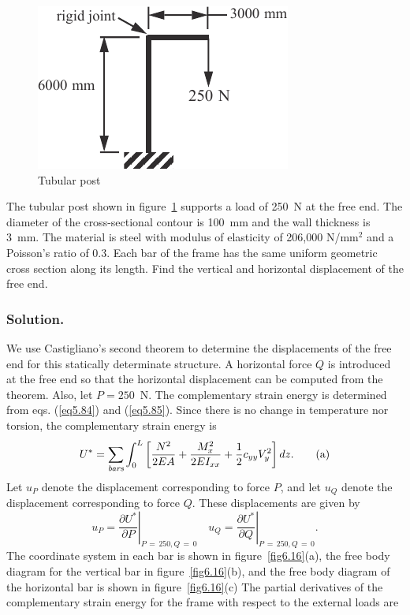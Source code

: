 \documentclass{AeroStructure-ERJohnson}
\begin{document}
\begin{figure}
\vspace{12pt}
\includegraphics{Figure_6-15.pdf}
\caption{Tubular post \label{fig6.15}}
\end{figure}

\begin{example}\label{ex6.7}The tubular post shown in figure~\ref{fig6.15} supports a load of 250~N at the free end. The diameter of the cross-sectional contour is 100~mm and the wall thickness is 3~mm. The material is steel with modulus of elasticity of 206,000 N/mm$^2$ and a Poisson's ratio of 0.3. Each bar of the frame has the same uniform geometric cross section along its length. Find the vertical and horizontal displacement of the free end.


\subsubsection{Solution.} We use Castigliano's second theorem to determine the displacements of the free end for this statically determinate structure. A horizontal force $Q$ is introduced at the free end so that the horizontal displacement can be computed from the theorem. Also, let $P = 250$~N. The complementary strain energy is determined from eqs. (\ref{eq5.84}) and (\ref{eq5.85}). Since there is no change in temperature nor torsion, the complementary strain energy is
\begin{equation*}
U^{*}=\sum_{{\it bars}}\int_{0}^{L}\left[\frac{N^{2}}{2 E A}+\frac{M_{x}^{2}}{2 E I_{x x}}+\frac{1}{2} c_{y y} V_{y}^{2}\right] d z.\tag{a}
\end{equation*}
Let $u_{P}$ denote the displacement corresponding to force $P$, and let $u_{Q}$ denote the displacement corresponding to force $Q$. These displacements are given by\pagebreak
\begin{equation*}
u_{P}=\left.\frac{\partial U^{*}}{\partial P}\right|_{P\,=\,250, Q\,=\,0} \quad u_{Q}=\left.\frac{\partial U^{*}}{\partial Q}\right|_{P\,=\,250, Q\,=\,0}.\tag{b}
\end{equation*}
The coordinate system in each bar is shown in figure~\ref{fig6.16}(a), the free body diagram for the vertical bar in figure~\ref{fig6.16}(b), and the free body diagram of the horizontal bar is shown in figure~\ref{fig6.16}(c) The partial derivatives of the complementary strain energy for the frame with respect to the external loads are


\end{example}
\end{document}
